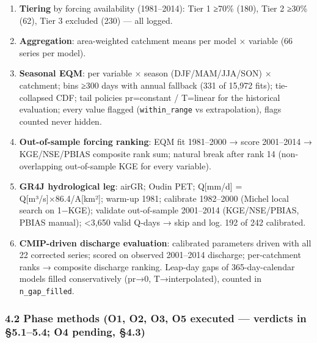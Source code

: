\documentclass[
  english,
  11pt,
]{article}
\providecommand{\tightlist}{%
  \setlength{\itemsep}{0pt}\setlength{\parskip}{0pt}}
\begin{document}
\begin{enumerate}
\def\labelenumi{\arabic{enumi}.}
\tightlist
\item
  \textbf{Tiering} by forcing availability (1981--2014): Tier 1 ≥70\%
  (180), Tier 2 ≥30\% (62), Tier 3 excluded (230) --- all logged.
\item
  \textbf{Aggregation}: area-weighted catchment means per model ×
  variable (66 series per model).
\item
  \textbf{Seasonal EQM}: per variable × season (DJF/MAM/JJA/SON) ×
  catchment; bins ≥300 days with annual fallback (331 of 15,972 fits);
  tie-collapsed CDF; tail policies pr=constant / T=linear for the
  historical evaluation; every value flagged (\texttt{within\_range} vs
  extrapolation), flags counted never hidden.
\item
  \textbf{Out-of-sample forcing ranking}: EQM fit 1981--2000 → score
  2001--2014 → KGE/NSE/PBIAS composite rank sum; natural break after
  rank 14 (non-overlapping out-of-sample KGE for every variable).
\item
  \textbf{GR4J hydrological leg}: airGR; Oudin PET; Q{[}mm/d{]} =
  Q{[}m³/s{]}×86.4/A{[}km²{]}; warm-up 1981; calibrate 1982--2000
  (Michel local search on 1−KGE); validate out-of-sample 2001--2014
  (KGE/NSE/PBIAS, PBIAS manual); \textless3,650 valid Q-days → skip and
  log. 192 of 242 calibrated.
\item
  \textbf{CMIP-driven discharge evaluation}: calibrated parameters
  driven with all 22 corrected series; scored on observed 2001--2014
  discharge; per-catchment ranks → composite discharge ranking. Leap-day
  gaps of 365-day-calendar models filled conservatively (pr→0,
  T→interpolated), counted in \texttt{n\_gap\_filled}.
\end{enumerate}

\subsubsection{4.2 Phase methods (O1, O2, O3, O5 executed --- verdicts
in §5.1--5.4; O4 pending,
§4.3)}\label{phase-methods-o1-o2-o3-o5-executed-verdicts-in-5.15.4-o4-pending-4.3}
\end{document}
